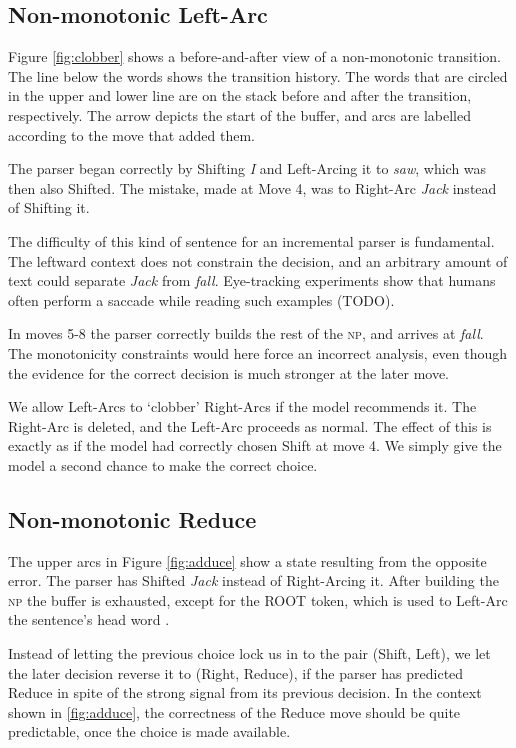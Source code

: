 \documentclass[11pt,letterpaper]{article}
\begin{document}
\subsection{Non-monotonic Left-Arc}

Figure \ref{fig:clobber} shows a before-and-after view of a non-monotonic
transition. The line below the words shows the transition history.
The words that are circled in the upper and lower line are on the stack before
and after the transition, respectively. The arrow depicts the start of the buffer,
and arcs are labelled according to the move that added them. 

The parser began correctly by Shifting \emph{I}
and Left-Arcing it to \emph{saw}, which was then also Shifted. The mistake, made
at Move 4, was to Right-Arc \emph{Jack} instead of Shifting it.

The difficulty of this kind of sentence for an incremental parser is fundamental.
The leftward context does not constrain the decision, 
and an arbitrary amount of text could separate \emph{Jack} from
\emph{fall}. Eye-tracking
experiments show that humans often perform a saccade while reading such examples (TODO).

In moves 5-8 the parser correctly builds the rest of the \textsc{np}, and arrives
at \emph{fall}. The monotonicity constraints would here force an incorrect analysis,
even though the evidence for the correct decision is much stronger at the later move.

We allow Left-Arcs to `clobber' Right-Arcs if the model
recommends it. The Right-Arc is deleted, and the Left-Arc proceeds as normal. The
effect of this is exactly as if the model had correctly chosen Shift at
move 4. We simply give the model a second chance to make the correct choice.

\subsection{Non-monotonic Reduce}

The upper arcs in Figure \ref{fig:adduce} show a state resulting from the opposite error.
The parser has Shifted \emph{Jack} instead of Right-Arcing it. After
building the \textsc{np} the buffer is exhausted, except for the ROOT token,
which is used to Left-Arc the sentence's head word \citep{nivre:squib}.

Instead of letting the previous choice lock us in to the pair (Shift, Left), we let
the later decision reverse it to (Right, Reduce), if the parser has predicted
Reduce in spite of the strong signal from its previous decision.
In the context shown in \ref{fig:adduce}, the correctness of the Reduce move should be
quite predictable, once the choice is made available.
\end{document}
